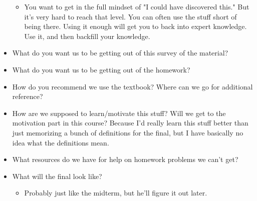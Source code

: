 \documentclass[../notes.tex]{subfiles}
\begin{document}
\begin{itemize}
\begin{itemize}
        \item You want to get in the full mindset of "I could have discovered this." But it's very hard to reach that level. You can often use the stuff short of being there. Using it enough will get you to back into expert knowledge. Use it, and then backfill your knowledge.
    \end{itemize}
    \item What do you want us to be getting out of this survey of the material?
    \item What do you want us to be getting out of the homework?
    \item How do you recommend we use the textbook? Where can we go for additional reference?
    \item How are we supposed to learn/motivate this stuff? Will we get to the motivation part in this course? Because I'd really learn this stuff better than just memorizing a bunch of definitions for the final, but I have basically no idea what the definitions mean.
    \item What resources do we have for help on homework problems we can't get?
    \item What will the final look like?
    \begin{itemize}
        \item Probably just like the midterm, but he'll figure it out later.
    \end{itemize}
\end{itemize}
\end{document}
